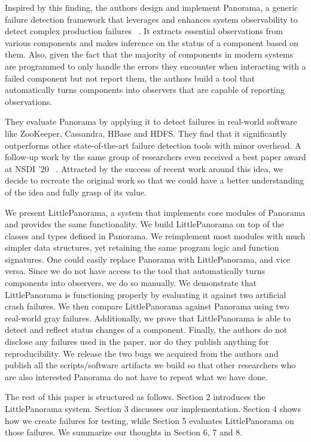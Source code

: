 Inspired by this finding, the authors design and implement Panorama, a generic failure detection framework that leverages and enhances system observability to detect complex production failures ~\cite{huang2018capturing}. It extracts essential observations from various components and makes inference on the status of a component based on them. Also, given the fact that the majority of components in modern systems are programmed to only handle the errors they encounter when interacting with a failed component but not report them, the authors build a tool that automatically turns components into observers that are capable of reporting observations.

They evaluate Panorama by applying it to detect failures in real-world software like ZooKeeper, Cassandra, HBase and HDFS. They find that it significantly outperforms other state-of-the-art failure detection tools with minor overhead. A follow-up work by the same group of researchers even received a best paper award at NSDI '20 ~\cite{246326}. Attracted by the success of recent work around this idea, we decide to recreate the original work so that we could have a better understanding of the idea and fully grasp of its value. 

We present LittlePanorama, a system that implements core modules of Panorama and provides the same functionality. We build LittlePanorama on top of the classes and types defined in Panorama. We reimplement most modules with much simpler data structures, yet retaining the same program logic and function signatures. One could easily replace Panorama with LittlePanorama, and vice versa. Since we do not have access to the tool that automatically turns components into observers, we do so manually. We demonstrate that LittlePanorama is functioning properly by evaluating it against two artificial crash failures. We then compare LittlePanorama against Panorama using two real-world gray failures. Additionally, we prove that LittlePanorama is able to detect and reflect status changes of a component. Finally, the authors do not disclose any failures used in the paper, nor do they publish anything for reproducibility. We release the two bugs we acquired from the authors and publish all the scripts/software artifacts we build so that other researchers who are also interested Panorama do not have to repeat what we have done.

The rest of this paper is structured as follows. Section 2 introduces the LittlePanorama system. Section 3 discusses our implementation. Section 4 shows how we create failures for testing, while Section 5 evaluates LittlePanorama on those failures. We summarize our thoughts in Section 6, 7 and 8.
